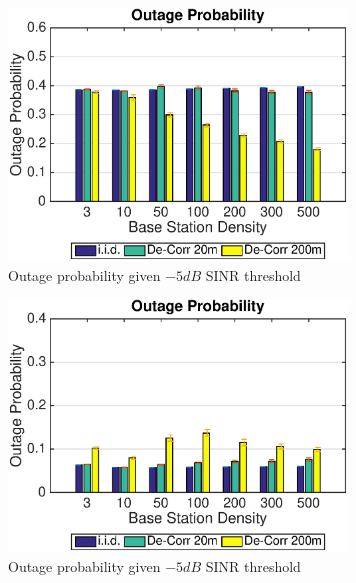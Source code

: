\documentclass[journal,10pt]{IEEEtran}
\begin{document}
 \begin{figure}
 \centering
 \includegraphics[width=9cm]{NBMax1000OutageProbThresh-5iid.eps}
 \caption{Outage probability given $-5dB$ SINR threshold}
 \label{fig: outprob1}
 \end{figure}
 \begin{figure}
 \centering
 \includegraphics[width=9cm]{MaxMax1000OutageProbThresh-5iid.eps}
 \caption{Outage probability given $-5dB$ SINR threshold}
 \label{fig: outprobs2}
 \end{figure}
\end{document}

